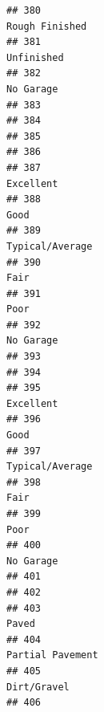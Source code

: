 \documentclass[
]{article}
\begin{document}
\begin{verbatim}
## 380                                                                             Rough Finished
## 381                                                                                 Unfinished
## 382                                                                                  No Garage
## 383                                                                                           
## 384                                                                                           
## 385                                                                                           
## 386                                                                                           
## 387                                                                                  Excellent
## 388                                                                                       Good
## 389                                                                            Typical/Average
## 390                                                                                       Fair
## 391                                                                                       Poor
## 392                                                                                  No Garage
## 393                                                                                           
## 394                                                                                           
## 395                                                                                  Excellent
## 396                                                                                       Good
## 397                                                                            Typical/Average
## 398                                                                                       Fair
## 399                                                                                       Poor
## 400                                                                                  No Garage
## 401                                                                                           
## 402                                                                                           
## 403                                                                                     Paved 
## 404                                                                           Partial Pavement
## 405                                                                                Dirt/Gravel
## 406                                                                                           

\end{verbatim}
\end{document}
